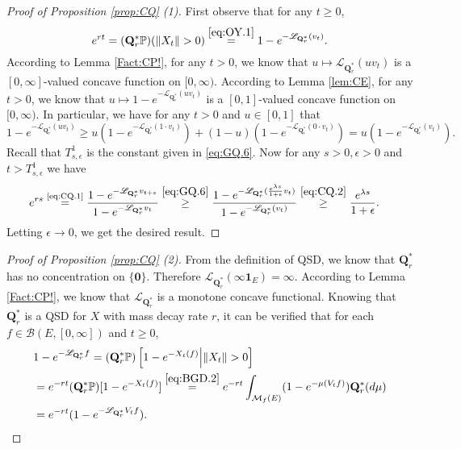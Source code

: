 \documentclass[12pt,a4paper]{amsart}
\numberwithin{equation}{section}
\theoremstyle{plain}
\theoremstyle{definition}
\theoremstyle{remark}
\begin{document}
\begin{proof}[Proof of Proposition \ref{prop:CQ} (1)]
	First observe that for any $t\geq 0$,
\begin{equation} \label{eq:CQ.1}
	e^{rt} = (\mathbf Q_r^*\mathbb P)(\|X_t\|>0)
	\overset{\eqref{eq:OY.1}}= 1 - e^{- \mathscr L_{\mathbf Q_r^*}(v_t)}.
\end{equation}
	According to Lemma \ref{Fact:CP!}, for any $t>0$, we know that $u\mapsto \mathscr L_{\mathbf Q_r^*} (uv_t)$ is a $[0,\infty]$-valued concave function on $[0,\infty)$.
	According to Lemma \ref{lem:CE}, for any $t>0$, we know that $u \mapsto 1 - e^{- \mathscr L_{\mathbf Q_r^*}(uv_t)}$ is a $[0,1]$-valued concave function on $[0, \infty)$.
	 In particular, we have for any $t>0$ and $u \in [0,1]$ that
\begin{equation} \label{eq:CQ.2}
		1 - e^{- \mathscr L_{\mathbf Q_r^*}(uv_t)} \geq u(1 - e^{- \mathscr L_{\mathbf Q_r^*}(1\cdot v_t)}) + (1-u) (1 - e^{- \mathscr L_{\mathbf Q_r^*}(0 \cdot v_t)})  = u(1 - e^{- \mathscr L_{\mathbf Q_r^*}(v_t)}).
\end{equation}
Recall that $T^1_{s,\epsilon}$ is the constant given in \eqref{eq:GQ.6}. Now for any $s>0, \epsilon > 0$ and $t > T^1_{s, \epsilon}$ we have
\begin{align}
	& e^{rs} \overset{\text{\eqref{eq:CQ.1}}}= \frac{1 - e^{-\mathscr L_{\mathbf Q_r^*}v_{t+s}}}{1 - e^{-\mathscr L_{\mathbf Q_r^*}v_{t}}}
	\overset{\eqref{eq:GQ.6}}\geq \frac{1 - e^{-\mathscr L_{\mathbf Q_r^*}( \frac{e^{\lambda s}}{1+\epsilon}v_t )}}{1 - e^{-\mathscr L_{\mathbf Q_r^*}(v_{t})}}
	\overset{\eqref{eq:CQ.2}}\geq \frac{e^{\lambda s}}{1+\epsilon}.
\end{align}
	Letting $\epsilon \to 0$, we get the desired result.
\end{proof}

\begin{proof}[Proof of Proposition \ref{prop:CQ} (2)]
	From the definition of QSD, we know that $\mathbf Q_r^*$ has no concentration
	on $\{\mathbf 0\}$.
	Therefore $\mathscr L_{\mathbf Q_r^*}(\infty  \mathbf 1_E) = \infty$.
	According to Lemma \ref{Fact:CP!}, we know that $\mathscr L_{\mathbf Q_r^*}$ is a monotone concave functional.
	Knowing that $\mathbf Q^*_r$ is a QSD for $X$ with mass decay rate $r$, it can be verified that for each $f\in \mathcal B(E,[0,\infty])$ and $t\geq 0$,
\begin{align}
	&1 - e^{-\mathscr L_{\mathbf Q_r^*}f}
	= (\mathbf Q_r^* \mathbb P) \left[1 - e^{-X_t(f)} \middle|\|X_t\|>0 \right]
	\\&= e^{-rt}(\mathbf Q_r^*\mathbb P)[1 - e^{- X_t(f)}]
	\overset{\eqref{eq:BGD.2}}= e^{-rt} \int_{\mathcal M_f(E)} (1 - e^{-\mu(V_tf)}) \mathbf Q_r^*(d\mu)
	\\&= e^{-rt} (1 - e^{- \mathscr L_{\mathbf Q_r^*}V_tf}).
	\qedhere
\end{align}
	
\end{proof}
\end{document}
